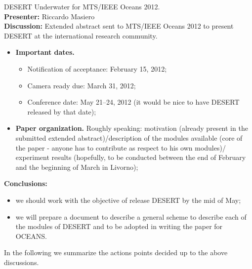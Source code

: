 \documentclass[11pt,journal,draftclsnofoot,onecolumn,twoside,letterpaper]{IEEEtran}
\theoremstyle{definition} \newtheorem{definition}[]{Definition}
\theoremstyle{theorem} \newtheorem{theorem}[]{Theorem}
\begin{document}
  DESERT Underwater for MTS/IEEE Oceans 2012.\\
{\bf Presenter:} Riccardo Masiero\\
{\bf Discussion:}
Extended abstract sent to MTS/IEEE Oceans 2012 to present DESERT at the international research community.
\begin{itemize}
 \item {\bf Important dates.} 
\begin{itemize} \item Notification of acceptance: February 15, 2012; \item Camera ready due: March 31, 2012; \item Conference date: May 21--­24, 2012 (it would be nice to have DESERT released by that date); \end{itemize}
 \item {\bf Paper organization.} Roughly speaking: motivation (already present in the submitted extended abstract)/description of the 
modules available (core of the paper - anyone has to contribute as respect to his own modules)/ experiment results (hopefully, to be conducted between the end of February and the beginning of March in Livorno);
 \end{itemize}
{\bf Conclusions:} 
\begin{itemize} 
\item we should work with the objective of release DESERT by the mid of May;
\item we will prepare a document to describe a general scheme to describe each of the modules of DESERT and to be adopted in writing the paper for OCEANS.
\end{itemize}

\newpage


In the following we summarize the actions points decided up to the above discussions. 
\end{document}
